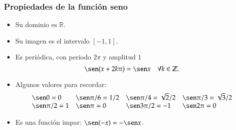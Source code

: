 	
	\begin{frame}
		\frametitle{Propiedades de la función seno}
		\begin{itemize}
			\item Su dominio es $\mathbb{R}$.
			\item Su imagen es el intervalo $[-1,1]$.
			\item Es periódica, con periodo $2\pi$ y amplitud $1$
			      \[\sen (x+2k\pi)= \sen x\quad \forall k\in \mathbb{Z}.\]
			\item Algunos valores para recordar:
			      \[
			      	\begin{array}{llll}
			      		\sen 0=0      & \sen \pi/6= 1/2 & \sen \pi/4=\sqrt{2}/2 & \sen \pi/3= \sqrt{3}/2 \\
			      		\sen \pi/2 =1 & \sen \pi = 0    & \sen 3\pi/2=-1        & \sen 2\pi=0            
			      	\end{array}
			      \]
			\item Es una función impar: $\sen(-x)=-\sen x$.
		\end{itemize}
	\end{frame} 
	
